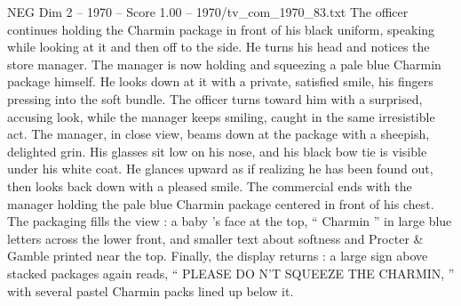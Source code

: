 \begin{textsample}{NEG Dim 2 – 1970 – Score 1.00 – 1970/tv\_com\_1970\_83.txt}
The officer continues holding the Charmin package in front of his black uniform, speaking while looking at it and then off to the side.
He turns his head and notices the store manager.
The manager is now holding and squeezing a pale blue Charmin package himself.
He looks down at it with a private, satisfied smile, his fingers pressing into the soft bundle.
The officer turns toward him with a surprised, accusing look, while the manager keeps smiling, caught in the same irresistible act.
The manager, in close view, beams down at the package with a sheepish, delighted grin.
His glasses sit low on his nose, and his black bow tie is visible under his white coat.
He glances upward as if realizing he has been found out, then looks back down with a pleased smile.
The commercial ends with the manager holding the pale blue Charmin package centered in front of his chest.
The packaging fills the view : a baby ’s face at the top, “ Charmin ” in large blue letters across the lower front, and smaller text about softness and Procter \& Gamble printed near the top.
Finally, the display returns : a large sign above stacked packages again reads, “ PLEASE DO N’T SQUEEZE THE CHARMIN, ” with several pastel Charmin packs lined up below it.

\end{textsample}
